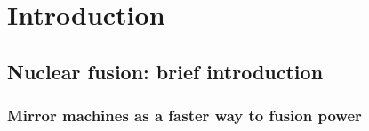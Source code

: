 \graphicspath{{Chapters/Chapter_intro/}}

\chapter{Introduction}
\label{ch:intro}

\section{Nuclear fusion: brief introduction}

\subsection{Mirror machines as a faster way to fusion power}

%
%
